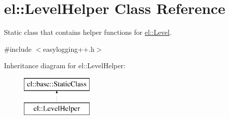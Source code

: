 \hypertarget{classel_1_1_level_helper}{}\section{el\+:\+:Level\+Helper Class Reference}
\label{classel_1_1_level_helper}


Static class that contains helper functions for \hyperlink{namespaceel_ab0ac6091262344c52dd2d3ad099e8e36}{el\+::\+Level}.  




{\ttfamily \#include $<$easylogging++.\+h$>$}

Inheritance diagram for el\+:\+:Level\+Helper\+:\begin{figure}[H]
\begin{center}
\leavevmode
\includegraphics[height=2.000000cm]{classel_1_1_level_helper}
\end{center}
\end{figure}

